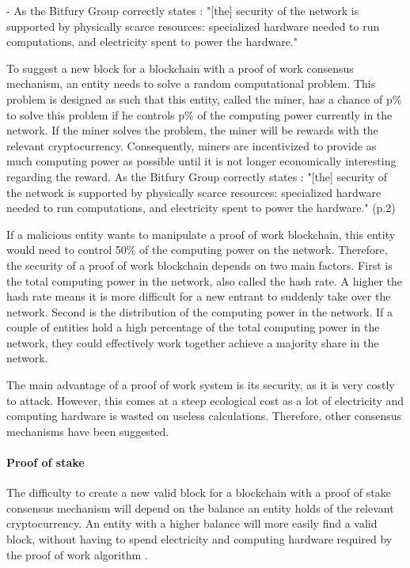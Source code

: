 - As the Bitfury Group correctly states \cite{bitfury-pos-vs-pow}: "[the] security of the network is supported by physically scarce resources: specialized hardware needed to run computations, and electricity spent to power the hardware." 
\fi

\iffalse
TODO: maybe add a small part about the alternative to a mining: merged mining and anchoring (cfr bitfury - group publc vs private prt 1)
\fi

To suggest a new block for a blockchain with a proof of work consensus mechanism, an entity needs to solve a random computational problem. This problem is designed as such that this entity, called the miner, has a chance of p\% to solve this problem if he controls p\% of the computing power currently in the network. If the miner solves the problem, the miner will be rewards with the relevant cryptocurrency. Consequently, miners are incentivized to provide as much computing power as possible until it is not longer economically interesting regarding the reward. As the Bitfury Group correctly states \cite{bitfury-pos-vs-pow}: "[the] security of the network is supported by physically scarce resources: specialized hardware needed to run computations, and electricity spent to power the hardware." (p.2)

If a malicious entity wants to manipulate a proof of work blockchain, this entity would need to control 50\% of the computing power on the network. Therefore, the security of a proof of work blockchain depends on two main factors. First is the total computing power in the network, also called the hash rate. A higher the hash rate means it is more difficult for a new entrant to suddenly take over the network. Second is the distribution of the computing power in the network. If a couple of entities hold a high percentage of the total computing power in the network, they could effectively work together achieve a majority share in the network.

The main advantage of a proof of work system is its security, as it is very costly to attack. However, this comes at a steep ecological cost as a lot of electricity and computing hardware is wasted on useless calculations. Therefore, other consensus mechanisms have been suggested.

\paragraph{Proof of stake}

The difficulty to create a new valid block for a blockchain with a proof of stake consensus mechanism will depend on the balance an entity holds of the relevant cryptocurrency. An entity with a higher balance will more easily find a valid block, without having to spend electricity and computing hardware required by the proof of work algorithm \cite{bitfury-pos-vs-pow}.

